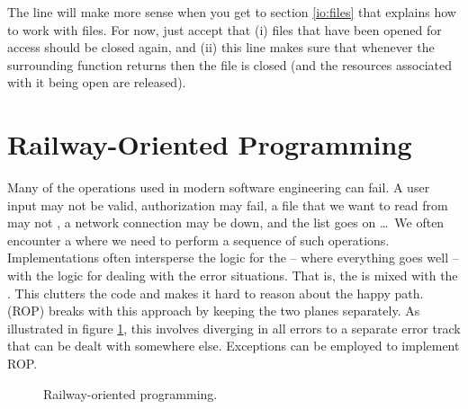 \inputminted[firstline=1]{go}{../src/go/exceptions/errorhandling/errorhandling.go}

The  line will make more sense when you get to section \ref{io:files} that explains how to work with files. For now, just accept that (i) files that have been opened for access should be closed again, and (ii) this line makes sure that whenever the surrounding function returns then the file is closed (and the resources associated with it being open are released).

\section{Railway-Oriented Programming}

Many of the operations used in modern software engineering can fail. A user input may not be valid, authorization may fail, a file that we want to read from may not , a network connection may be down, and the list goes on \ldots\ We often encounter a  where we need to perform a sequence of such operations. Implementations often intersperse the logic for the  -- where everything goes well -- with the logic for dealing with the error situations. That is, the  is mixed with the . This clutters the code and makes it hard to reason about the happy path.  (ROP) breaks with this approach by keeping the two planes separately. As illustrated in figure \ref{fig:exceptions:rop}, this involves diverging in all errors to a separate error track that can be dealt with somewhere else. Exceptions can be employed to implement ROP.

\begin{figure}[tbp]
  
  \caption{Railway-oriented programming.}
  \label{fig:exceptions:rop}
\end{figure}

